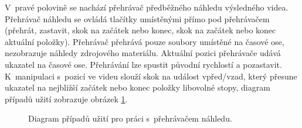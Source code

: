 V~pravé polovině se nachází přehrávač předběžného náhledu výsledného videa. Přehrávač náhledu se ovládá tlačítky umístěnými přímo pod přehrávačem (přehrát, zastavit, skok na začátek nebo konec, skok na začátek nebo konec aktuální položky). Přehrávač přehrává pouze soubory umístěné na časové ose, nezobrazuje náhledy zdrojového materiálu. Aktuální pozici přehrávače udává ukazatel na časové ose. Přehrávání lze spustit původní rychlostí a pozastavit. K~manipulaci s~pozicí ve videu slouží skok na událost vpřed/vzad, který přesune ukazatel na nejbližší začátek nebo konec položky libovolné stopy, diagram případů užití zobrazuje obrázek \ref{img:ucd-prehravac}.
\begin{figure}[!h]
	\centering
	\caption{Diagram případů užití pro práci s~přehrávačem náhledu.}\label{img:ucd-prehravac}
\end{figure}

